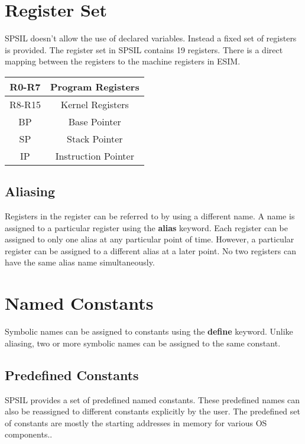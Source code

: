 \documentclass[11pt]{article}
\begin{document}
\section{Register Set}

SPSIL doesn't allow the use of declared variables. Instead a fixed set of registers is provided. The register set in SPSIL contains 19 registers. There is a direct mapping between the registers to the machine registers in ESIM.   \\

\begin{tabular}{| c | c | }
\hline
R0-R7 & Program Registers \\
\hline
R8-R15 & Kernel Registers \\
\hline
BP 		& Base Pointer \\
\hline
SP		& Stack Pointer \\
\hline
IP		& Instruction Pointer \\
\hline
\end{tabular}


\subsection{Aliasing}
Registers in the register can be referred to by using a different name. A name is assigned to a particular register using the \textbf{alias} keyword. Each register can be assigned to only one alias at any particular point of time. However, a particular register can be assigned to a different alias at a later point. No two registers can have the same alias name simultaneously.



\section{Named Constants}
Symbolic names can be assigned to constants using the \textbf{define} keyword. Unlike aliasing, two or more symbolic names can be assigned to the same constant. 
\subsection{Predefined Constants}
SPSIL provides a set of predefined named constants. These predefined names can also be reassigned to different constants explicitly by the user. The predefined set of constants are mostly the starting addresses in memory for various OS components..
\end{document}
